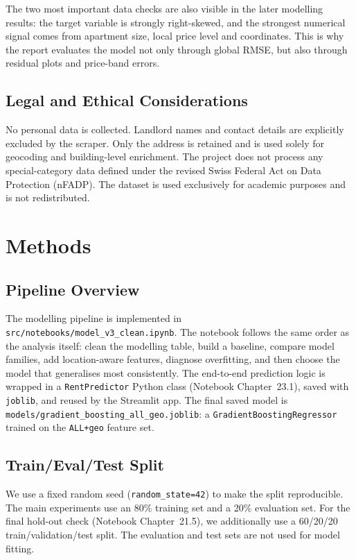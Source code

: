 \documentclass[11pt,a4paper]{article}
\begin{document}
The two most important data checks are also visible in the later modelling results: the target variable is strongly right-skewed, and the strongest numerical signal comes from apartment size, local price level and coordinates. This is why the report evaluates the model not only through global RMSE, but also through residual plots and price-band errors.



\subsection{Legal and Ethical Considerations}
No personal data is collected. Landlord names and contact details are explicitly excluded by the scraper. Only the address is retained and is used solely for geocoding and building-level enrichment. The project does not process any special-category data defined under the revised Swiss Federal Act on Data Protection (nFADP). The dataset is used exclusively for academic purposes and is not redistributed.

\section{Methods}
\label{sec:methods}

\subsection{Pipeline Overview}
The modelling pipeline is implemented in \texttt{src/notebooks/model\_v3\_clean.ipynb}. The notebook follows the same order as the analysis itself: clean the modelling table, build a baseline, compare model families, add location-aware features, diagnose overfitting, and then choose the model that generalises most consistently. The end-to-end prediction logic is wrapped in a \texttt{RentPredictor} Python class (Notebook Chapter~23.1), saved with \texttt{joblib}, and reused by the Streamlit app. The final saved model is \texttt{models/gradient\_boosting\_all\_geo.joblib}: a \texttt{GradientBoostingRegressor} trained on the \texttt{ALL+geo} feature set.

\subsection{Train/Eval/Test Split}
We use a fixed random seed (\texttt{random\_state=42}) to make the split reproducible. The main experiments use an 80\% training set and a 20\% evaluation set. For the final hold-out check (Notebook Chapter~21.5), we additionally use a 60/20/20 train/validation/test split. The evaluation and test sets are not used for model fitting.
\end{document}
